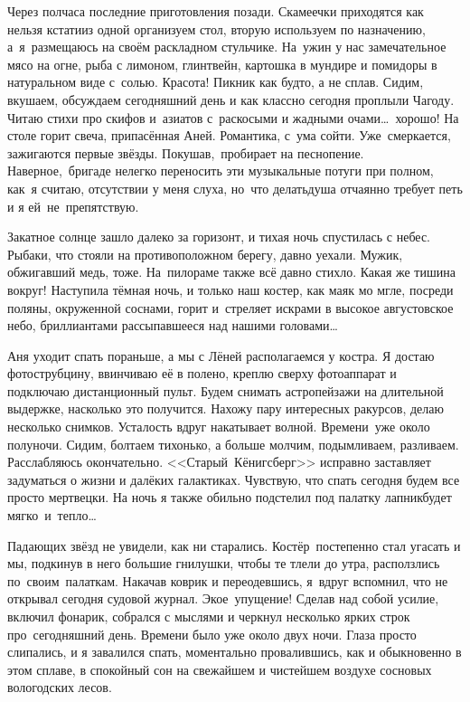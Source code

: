 Через полчаса последние приготовления позади. Скамеечки приходятся как нельзя кстати\mdash из одной организуем стол, вторую используем по назначению, а~я~размещаюсь на своём раскладном стульчике. На~ужин у нас замечательное мясо на огне, рыба с лимоном, глинтвейн, картошка в мундире и помидоры в натуральном виде с~солью. Красота! Пикник как будто, а не сплав. Сидим, вкушаем, обсуждаем сегодняшний день и как классно сегодня проплыли Чагоду. Читаю стихи про скифов и~азиатов с~раскосыми и жадными очами\ldots~хорошо! На столе горит свеча, припасённая Аней. Романтика, с~ума сойти. Уже~смеркается, зажигаются первые звёзды. Покушав,~пробирает на песнопение. Наверное,~бригаде нелегко переносить эти музыкальные потуги при полном, как~я считаю, отсутствии у меня слуха, но~что делать\mdash душа отчаянно требует петь и я ей~не~препятствую. 

Закатное солнце зашло далеко за горизонт, и тихая ночь спустилась с небес. Рыбаки, что стояли на противоположном берегу, давно уехали. Мужик, обжигавший медь, тоже. На~пилораме также всё давно стихло. Какая же тишина вокруг! Наступила тёмная ночь, и только наш костер, как маяк мо мгле, посреди поляны, окруженной соснами, горит и~стреляет искрами в высокое августовское небо, бриллиантами рассыпавшееся над нашими головами\ldots~

Аня уходит спать пораньше, а мы с Лёней располагаемся у костра. Я достаю фотострубцину, ввинчиваю её в полено, креплю сверху фотоаппарат и подключаю дистанционный пульт. Будем снимать астропейзажи на длительной выдержке, насколько это получится. Нахожу пару интересных ракурсов, делаю несколько снимков. Усталость вдруг накатывает волной. Времени~уже около полуночи. Сидим, болтаем тихонько, а больше молчим, подымливаем, разливаем. Расслабляюсь окончательно. <<Старый~Кёнигсберг>> исправно заставляет задуматься о жизни и далёких галактиках. Чувствую, что спать сегодня будем все просто мертвецки. На ночь я также обильно подстелил под палатку лапник\mdash будет мягко~и~тепло\ldots~
  
Падающих звёзд не увидели, как ни старались. Костёр~постепенно стал угасать и мы, подкинув в него большие гнилушки, чтобы те тлели до утра, расползлись по~своим~палаткам. Накачав коврик и переодевшись, я~вдруг вспомнил, что не открывал сегодня судовой журнал. Экое~упущение! Сделав над собой усилие, включил фонарик, собрался с мыслями и черкнул несколько ярких строк про~сегодняшний день. Времени было уже около двух ночи. Глаза просто слипались, и я завалился спать, моментально провалившись, как и обыкновенно в этом сплаве, в спокойный сон на свежайшем и чистейшем воздухе сосновых вологодских лесов.

\begin{center}
\end{center}